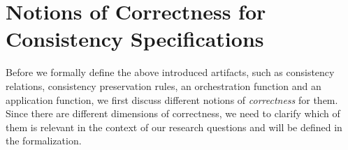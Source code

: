\section{Notions of Correctness for Consistency Specifications}
\label{chap:correctness:notions_correctness}




Before we formally define the above introduced artifacts, such as consistency relations, consistency preservation rules, an orchestration function and an application function, we first discuss different notions of \emph{correctness} for them.
Since there are different dimensions of correctness, we need to clarify which of them is relevant in the context of our research questions and will be defined in the formalization.

